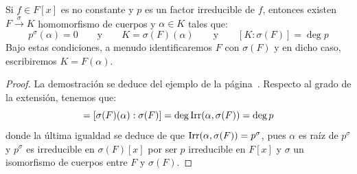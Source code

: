 \begin{lema}\label{lema:cuerpo_descomposicion}
    Si $f\in F[x]$ es no constante y $p$ es un factor irreducible de $f$, entonces existen $F\stackrel{\sigma}{\to}K$ homomorfismo de cuerpos y $\alpha\in K$ tales que:
    \begin{equation*}
        p^\sigma(\alpha) = 0 \qquad \text{y}\qquad  K = \sigma(F)(\alpha)
        \qquad \text{y}\qquad [K:\sigma(F)] = \deg p
    \end{equation*}
    Bajo estas condiciones, a menudo identificaremos $F$ con $\sigma(F)$ y en dicho caso, escribiremos $K= F(\alpha)$.
    \begin{proof}
        La demostración se deduce del ejemplo de la página~\pageref{ejemplo:cuerpo_descomposicion}. Respecto al grado de la extensión, tenemos que:
        \begin{equation*}
            [K:\sigma(F)] = [\sigma(F)(\alpha):\sigma(F)] = \deg \Irr(\alpha,\sigma(F)) = \deg p
        \end{equation*}
        donde la última igualdad se deduce de que $\operatorname{Irr}(\alpha,\sigma(F)) = p^\sigma$, pues $\alpha$ es raíz de $p^\sigma$ y $p^\sigma$ es irreducible en $\sigma(F)[x]$ por ser $p$ irreducible en $F[x]$ y $\sigma$ un isomorfismo de cuerpos entre $F$ y $\sigma(F)$.        
    \end{proof}
\end{lema}

